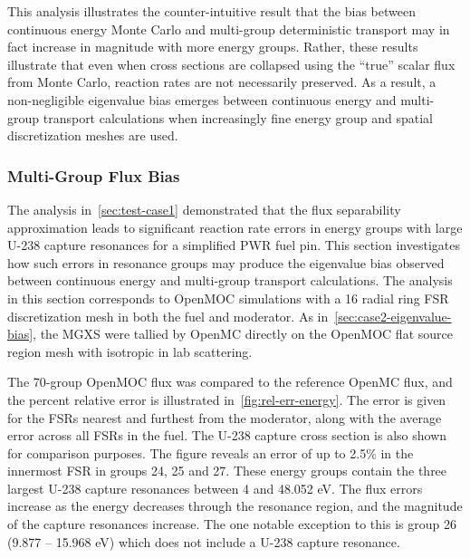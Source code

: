 This analysis illustrates the counter-intuitive result that the bias between continuous energy Monte Carlo and multi-group deterministic transport may in fact increase in magnitude with more energy groups. Rather, these results illustrate that even when cross sections are collapsed using the ``true'' scalar flux from Monte Carlo, reaction rates are not necessarily preserved. As a result, a non-negligible eigenvalue bias emerges between continuous energy and multi-group transport calculations when increasingly fine energy group and spatial discretization meshes are used.



\subsubsection{Multi-Group Flux Bias}
\label{sec:case2-flux-bias}

The analysis in~\autoref{sec:test-case1} demonstrated that the flux separability approximation leads to significant reaction rate errors in energy groups with large U-238 capture resonances for a simplified PWR fuel pin. This section investigates how such errors in resonance groups may produce the eigenvalue bias observed between continuous energy and multi-group transport calculations. The analysis in this section corresponds to OpenMOC simulations with a 16 radial ring FSR discretization mesh in both the fuel and moderator. As in~\autoref{sec:case2-eigenvalue-bias}, the MGXS were tallied by OpenMC directly on the OpenMOC flat source region mesh with isotropic in lab scattering.

The 70-group OpenMOC flux was compared to the reference OpenMC flux, and the percent relative error is illustrated in~\autoref{fig:rel-err-energy}. The error is given for the FSRs nearest and furthest from the moderator, along with the average error across all FSRs in the fuel. The U-238 capture cross section is also shown for comparison purposes. The figure reveals an error of up to 2.5\% in the innermost FSR in groups 24, 25 and 27. These energy groups contain the three largest U-238 capture resonances between 4 and 48.052 eV. The flux errors increase as the energy decreases through the resonance region, and the magnitude of the capture resonances increase. The one notable exception to this is group 26 (9.877 -- 15.968 eV) which does not include a U-238 capture resonance.

